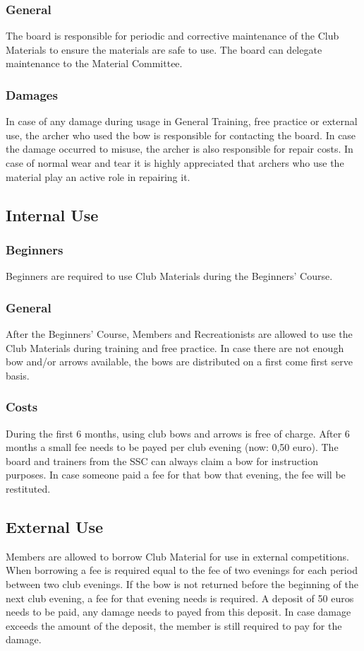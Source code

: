 \documentclass[a4paper]{article}
\begin{document}
\subsubsection{General}
The board is responsible for periodic and corrective maintenance of the Club Materials to ensure the materials are safe to use. The board can delegate maintenance to the Material Committee. 

\subsubsection{Damages}
In case of any damage during usage in General Training, free practice or external use, the archer who used the bow is responsible for contacting the board. In case the damage occurred to misuse, the archer is also responsible for repair costs. In case of normal wear and tear it is highly appreciated that archers who use the material play an active role in repairing it.

\subsection{Internal Use}
\subsubsection{Beginners}
Beginners are required to use Club Materials during the Beginners' Course.

\subsubsection{General}
After the Beginners' Course, Members and Recreationists are allowed to use the Club Materials during training and free practice. In case there are not enough bow and/or arrows available, the bows are distributed on a first come first serve basis.

\subsubsection{Costs}
During the first 6 months, using club bows and arrows is free of charge. After 6 months a small fee needs to be payed per club evening (now: 0,50 euro). The board and trainers from the SSC can always claim a bow for instruction purposes. In case someone paid a fee for that bow that evening, the fee will be restituted.

\subsection{External Use}
Members are allowed to borrow Club Material for use in external competitions. When borrowing a fee is required equal to the fee of two evenings for each period between two club evenings. If the bow is not returned before the beginning of the next club evening, a fee for that evening needs is required. A deposit of 50 euros needs to be paid, any damage needs to payed from this deposit. In case damage exceeds the amount of the deposit, the member is still required to pay for the damage. \\
\end{document}
